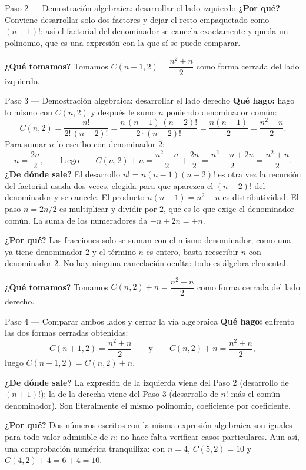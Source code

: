 \documentclass[11pt]{article}
\begin{document}
\begin{sol}
\begin{paso}{Paso 2 --- Demostración algebraica: desarrollar el lado izquierdo}
\textbf{¿Por qué?} Conviene desarrollar solo dos factores y dejar el resto empaquetado como
$(n-1)!$: así el factorial del denominador se cancela exactamente y queda un polinomio, que
es una expresión con la que sí se puede comparar.

\textbf{¿Qué tomamos?} Tomamos $C(n+1,2)=\dfrac{n^{2}+n}{2}$ como forma cerrada del lado
izquierdo.
\end{paso}

\begin{paso}{Paso 3 --- Demostración algebraica: desarrollar el lado derecho}
\textbf{Qué hago:} hago lo mismo con $C(n,2)$ y después le sumo $n$ poniendo denominador
común:
\[
C(n,2)=\frac{n!}{2!\,(n-2)!}=\frac{n\,(n-1)\,(n-2)!}{2\cdot (n-2)!}=\frac{n(n-1)}{2}
=\frac{n^{2}-n}{2}.
\]
Para sumar $n$ lo escribo con denominador $2$:
\[
n=\frac{2n}{2},
\qquad\text{luego}\qquad
C(n,2)+n=\frac{n^{2}-n}{2}+\frac{2n}{2}=\frac{n^{2}-n+2n}{2}=\frac{n^{2}+n}{2}.
\]
\textbf{¿De dónde sale?} El desarrollo $n!=n(n-1)(n-2)!$ es otra vez la recursión del
factorial usada dos veces, elegida para que aparezca el $(n-2)!$ del denominador y se cancele.
El producto $n(n-1)=n^{2}-n$ es distributividad. El paso $n=2n/2$ es multiplicar y dividir por
$2$, que es lo que exige el denominador común. La suma de los numeradores da
$-n+2n=+n$.

\textbf{¿Por qué?} Las fracciones solo se suman con el mismo denominador; como una ya tiene
denominador $2$ y el término $n$ es entero, basta reescribir $n$ con denominador $2$. No hay
ninguna cancelación oculta: todo es álgebra elemental.

\textbf{¿Qué tomamos?} Tomamos $C(n,2)+n=\dfrac{n^{2}+n}{2}$ como forma cerrada del lado
derecho.
\end{paso}

\begin{paso}{Paso 4 --- Comparar ambos lados y cerrar la vía algebraica}
\textbf{Qué hago:} enfrento las dos formas cerradas obtenidas:
\[
C(n+1,2)=\frac{n^{2}+n}{2}
\qquad\text{y}\qquad
C(n,2)+n=\frac{n^{2}+n}{2},
\]
luego $C(n+1,2)=C(n,2)+n$.

\textbf{¿De dónde sale?} La expresión de la izquierda viene del Paso 2 (desarrollo de
$(n+1)!$); la de la derecha viene del Paso 3 (desarrollo de $n!$ más el común denominador).
Son literalmente el mismo polinomio, coeficiente por coeficiente.

\textbf{¿Por qué?} Dos números escritos con la misma expresión algebraica son iguales para
todo valor admisible de $n$; no hace falta verificar casos particulares. Aun así, una
comprobación numérica tranquiliza: con $n=4$, $C(5,2)=10$ y $C(4,2)+4=6+4=10$.


\end{paso}
\end{sol}
\end{document}
